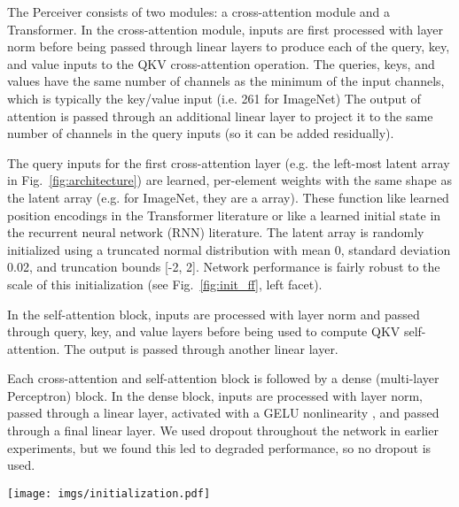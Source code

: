 \documentclass{article}
\begin{document}
The Perceiver consists of two modules: a cross-attention module and a Transformer. In the cross-attention module, inputs are first processed with layer norm \cite{ba2016layer} before being passed through linear layers to produce each of the query, key, and value inputs to the QKV cross-attention operation. The queries, keys, and values have the same number of channels as the minimum of the input channels, which is typically the key/value input (i.e. 261 for ImageNet) The output of attention is passed through an additional linear layer to project it to the same number of channels in the query inputs (so it can be added residually).

The query inputs for the first cross-attention layer (e.g. the left-most latent array in Fig.~\ref{fig:architecture}) are learned, per-element weights with the same shape as the latent array (e.g. for ImageNet, they are a  array). These function like learned position encodings in the Transformer literature or like a learned initial state in the recurrent neural network (RNN) literature. The latent array is randomly initialized using a truncated normal distribution with mean 0, standard deviation 0.02, and truncation bounds [-2, 2]. Network performance is fairly robust to the scale of this initialization (see Fig.~\ref{fig:init_ff}, left facet).

In the self-attention block, inputs are processed with layer norm and passed through query, key, and value layers before being used to compute QKV self-attention. The output is passed through another linear layer.

Each cross-attention and self-attention block is followed by a dense (multi-layer Perceptron) block. In the dense block, inputs are processed with layer norm, passed through a linear layer, activated with a GELU nonlinearity \cite{hendrycks2016gelu}, and passed through a final linear layer. We used dropout throughout the network in earlier experiments, but we found this led to degraded performance, so no dropout is used.

\begin{figure*}[t]
    \centering
    \texttt{[image: imgs/initialization.pdf]}
    \vspace{-12pt}
    \caption{The effect of latent initialization scale and Fourier feature (FF) position encoding parameters on performance. All plots show top-1 accuracy (higher is better). The model with initialization scale of 0.1 diverged during training. Generally, increasing the number of bands and max resolution (up to Nyquist) increased performance. We observed the same effects whether using linearly or logarithmically spaced position encoding bands.}
    \label{fig:init_ff}
\end{figure*}
\end{document}
